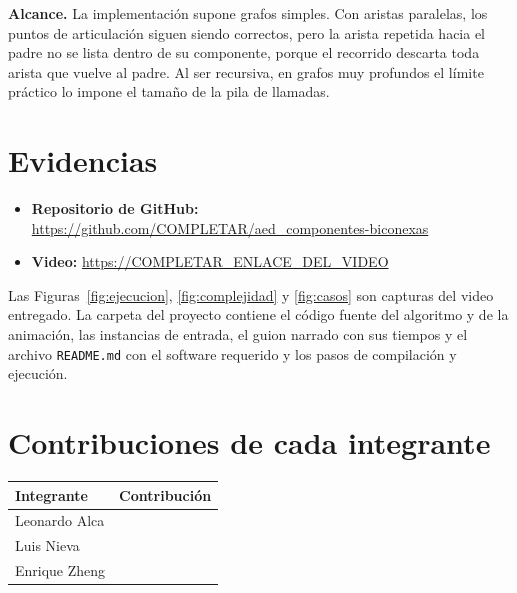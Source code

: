 \documentclass[11pt,a4paper]{article}
\numberwithin{equation}{section}
\newcommand{\enlacerepo}{https://github.com/COMPLETAR/aed_componentes-biconexas}
\newcommand{\enlacevideo}{https://COMPLETAR_ENLACE_DEL_VIDEO}
\begin{document}
\textbf{Alcance.} La implementación supone grafos simples. Con aristas paralelas, los puntos de articulación siguen siendo correctos, pero la arista repetida hacia el padre no se lista dentro de su componente, porque el recorrido descarta toda arista que vuelve al padre. Al ser recursiva, en grafos muy profundos el límite práctico lo impone el tamaño de la pila de llamadas.

\section{Evidencias}
\label{sec:evidencias}
\begin{itemize}
\item \textbf{Repositorio de GitHub:} \url{\enlacerepo}
\item \textbf{Video:} \url{\enlacevideo}
\end{itemize}
Las Figuras~\ref{fig:ejecucion}, \ref{fig:complejidad} y \ref{fig:casos} son capturas del video entregado. La carpeta del proyecto contiene el código fuente del algoritmo y de la animación, las instancias de entrada, el guion narrado con sus tiempos y el archivo \texttt{README.md} con el software requerido y los pasos de compilación y ejecución.

\section{Contribuciones de cada integrante}
\label{sec:contribuciones}
\begin{table}[H]
\centering
\small
\renewcommand{\arraystretch}{2.2}
\begin{tabularx}{\textwidth}{l X}
\toprule
\textbf{Integrante} & \textbf{Contribución} \\
\midrule
Leonardo Alca  & \\
Luis Nieva     & \\
Enrique Zheng  & \\
\bottomrule
\end{tabularx}
\end{table}

\end{document}
